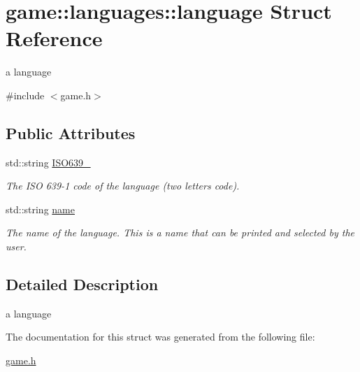 \hypertarget{structgame_1_1languages_1_1language}{}\section{game\+::languages\+::language Struct Reference}
\label{structgame_1_1languages_1_1language}


a language  




{\ttfamily \#include $<$game.\+h$>$}

\subsection*{Public Attributes}
\begin{DoxyCompactItemize}
\item 
\mbox{\label{structgame_1_1languages_1_1language_a66e474c6e3f9d05284b22d512ff9446b}} 
std\+::string \mbox{\hyperlink{structgame_1_1languages_1_1language_a66e474c6e3f9d05284b22d512ff9446b}{I\+S\+O639\+\_}}
\begin{DoxyCompactList}\small\item\em The I\+SO 639-\/1 code of the language (two letters code). \end{DoxyCompactList}\item 
\mbox{\label{structgame_1_1languages_1_1language_ade0a44ed041043c0a833c49e792632a7}} 
std\+::string \mbox{\hyperlink{structgame_1_1languages_1_1language_ade0a44ed041043c0a833c49e792632a7}{name}}
\begin{DoxyCompactList}\small\item\em The name of the language. This is a name that can be printed and selected by the user. \end{DoxyCompactList}\end{DoxyCompactItemize}


\subsection{Detailed Description}
a language 

The documentation for this struct was generated from the following file\+:\begin{DoxyCompactItemize}
\item 
\mbox{\hyperlink{game_8h}{game.\+h}}\end{DoxyCompactItemize}
